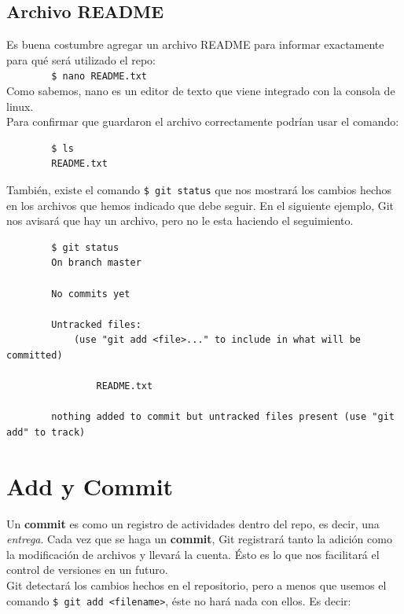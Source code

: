 \documentclass[a4paper, 12pt]{article}
\begin{document}
\subsection{Archivo README}

Es buena costumbre agregar un archivo README para informar exactamente para qué será utilizado el repo:\\

\verb+        $ nano README.txt+\\

Como sabemos, nano es un editor de texto que viene integrado con la consola de linux.\\
Para confirmar que guardaron el archivo correctamente podrían usar el comando:

\begin{verbatim}
        $ ls 
        README.txt
\end{verbatim}

También, existe el comando \texttt{\$ git status} que nos mostrará los cambios hechos en los archivos que hemos indicado que debe seguir. En el siguiente ejemplo, Git nos avisará que hay un archivo, pero no le esta haciendo el seguimiento.

\begin{verbatim}
        $ git status
        On branch master

        No commits yet

        Untracked files:
            (use "git add <file>..." to include in what will be committed)

                README.txt

        nothing added to commit but untracked files present (use "git add" to track)
\end{verbatim}

\newpage

\section{Add y Commit}

Un \textbf{commit} es como un registro de actividades dentro del repo, es decir, una \textit{entrega}. Cada vez que se haga un \textbf{commit}, Git registrará tanto la adición como la modificación de archivos y llevará la cuenta. Ésto es lo que nos facilitará el control de versiones en un futuro.\\

Git detectará los cambios hechos en el repositorio, pero a menos que usemos el comando \texttt{\$ git add <filename>}, éste no hará nada con ellos. Es decir:
\end{document}
